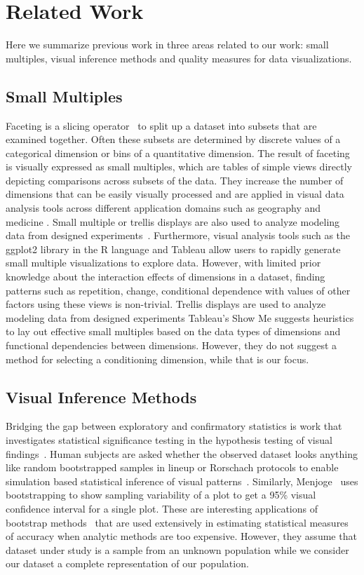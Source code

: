 \section{Related Work}
\label{sec:related}
Here we summarize previous work in three areas related to our work: small multiples, visual inference methods and quality measures for data visualizations.

\subsection{Small Multiples}
Faceting is a slicing operator~\cite{Wilkinson2005GG, Munzner2014} to split up a dataset into subsets that are examined together. Often these subsets are determined by discrete values of a categorical dimension or bins of a quantitative dimension. The result of faceting is visually expressed as small multiples, which are tables of simple views directly depicting comparisons across subsets of the data. They increase the number of dimensions that can be easily visually processed and are applied in visual data analysis tools across different application domains such as geography \cite{Guo2006, Maceachren2003} and medicine \cite{Lunzer2010, Sarni2005}. Small multiple or trellis displays are also used to analyze modeling data from designed experiments~\cite{Fuentes2011}.
Furthermore, visual analysis tools such as the ggplot2 library in the R language \cite{Wickham2006} and Tableau \cite{Stolte2002} allow users to rapidly generate small multiple visualizations to explore data. However, with limited prior knowledge about the interaction effects of dimensions in a dataset, finding patterns such as repetition, change, conditional dependence with values of other factors using these views is non-trivial. Trellis displays are used to analyze modeling data from designed experiments
Tableau's Show Me \cite{mackinlay2007} suggests heuristics to lay out effective small multiples based on the data types of dimensions and functional dependencies between dimensions. However, they do not suggest a method for selecting a conditioning dimension, while that is our focus. 

\subsection{Visual Inference Methods}
Bridging the gap between exploratory and confirmatory statistics is work that investigates statistical significance testing in the hypothesis testing of visual findings~\cite{Wickham2013, Majumder2013}. Human subjects are asked whether the observed dataset looks anything like random bootstrapped samples in lineup or Rorschach protocols to enable simulation based statistical inference of visual patterns~\cite{Buja2009}. Similarly, Menjoge~\cite{Menjoge2010} uses bootstrapping to show sampling variability of a plot to get a 95\% visual confidence interval for a single plot. These are interesting applications of bootstrap methods~\cite{Efron1979} that are used extensively in estimating statistical measures of accuracy when analytic methods are too expensive. However, they assume that dataset under study is a sample from an unknown population while we consider our dataset a complete representation of our population.


